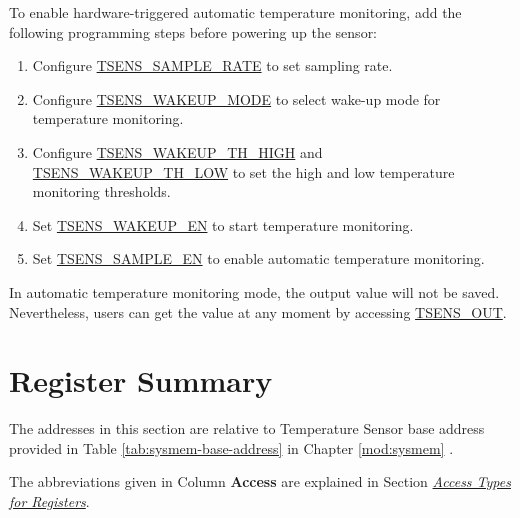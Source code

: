 \documentclass[main\_\_EN.tex]{subfiles}
\begin{document}
To enable hardware-triggered automatic temperature monitoring, add the following programming steps before powering up the sensor:
    \begin{enumerate}
        \item Configure \hyperref[fielddesc:TSENSSAMPLERATE]{TSENS\_SAMPLE\_RATE} to set sampling rate.
        \item Configure \hyperref[fielddesc:TSENSWAKEUPMODE]{TSENS\_WAKEUP\_MODE} to select wake-up mode for temperature monitoring.
        \item Configure \hyperref[fielddesc:TSENSWAKEUPTHHIGH]{TSENS\_WAKEUP\_TH\_HIGH} and \hyperref[fielddesc:TSENSWAKEUPTHLOW]{TSENS\_WAKEUP\_TH\_LOW} to set the high and low temperature monitoring thresholds.
        \item Set \hyperref[fielddesc:TSENSWAKEUPEN]{TSENS\_WAKEUP\_EN} to start temperature monitoring.
        \item Set \hyperref[fielddesc:TSENSSAMPLEEN]{TSENS\_SAMPLE\_EN} to enable automatic temperature monitoring.
    \end{enumerate}

In automatic temperature monitoring mode, the output value will not be saved. Nevertheless, users can get the value at any moment by accessing \hyperref[fielddesc:TSENSOUT]{TSENS\_OUT}.




\newpage
\hypertarget{tmpsen-reg-summ}{}
\section{Register Summary}
\label{sec:tmpsen-reg-summ}

The addresses in this section are relative to Temperature Sensor base address provided in Table \ref{tab:sysmem-base-address} in Chapter \ref{mod:sysmem} \textit{}.

The abbreviations given in Column \textbf{Access} are explained in Section \hyperref[glossary-access-types]{\textit{Access Types for Registers}}.


\end{document}
